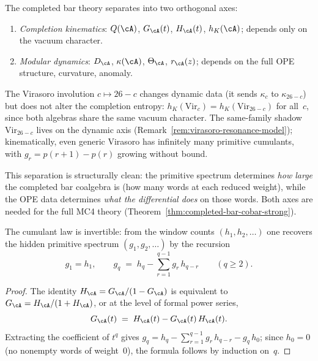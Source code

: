 \begin{remark}
\label{rem:kinematics-dynamics-split}

The completed bar theory separates into two orthogonal axes:
\begin{enumerate}[label=\textup{(\roman*)}]
\item \emph{Completion kinematics}:
 $Q(\cA)$, $G_\cA(t)$, $H_\cA(t)$, $h_K(\cA)$; depends
 only on the vacuum character.
\item \emph{Modular dynamics}:
 $D_\cA$, $\kappa(\cA)$, $\Theta_\cA$, $r_\cA(z)$; depends
 on the full OPE structure, curvature, anomaly.
\end{enumerate}
The Virasoro involution $c \mapsto 26 - c$ changes dynamic
data (it sends $\kappa_c$ to $\kappa_{26-c}$) but does not
alter the completion entropy:
$h_K(\mathrm{Vir}_c) = h_K(\mathrm{Vir}_{26-c})$
for all~$c$, since both algebras share the same vacuum
character. The same-family shadow $\mathrm{Vir}_{26-c}$
lives on the dynamic axis
(Remark~\ref{rem:virasoro-resonance-model});
kinematically, even generic Virasoro has infinitely many
primitive cumulants, with $g_r = p(r+1) - p(r)$ growing
without bound.

\smallskip
This separation is structurally clean: the primitive spectrum
determines \emph{how large} the completed bar coalgebra is
(how many words at each reduced weight), while the OPE data
determines \emph{what the differential does} on those words.
Both axes are needed for the full MC4 theory
(Theorem~\textup{\ref{thm:completed-bar-cobar-strong}}).
\end{remark}

\begin{proposition}
\label{prop:cumulant-window-inversion}

The cumulant law is invertible: from the window counts
$(h_1, h_2, \ldots)$ one recovers the hidden primitive spectrum
$(g_1, g_2, \ldots)$ by the recursion
\begin{equation}
\label{eq:cumulant-window-inversion}
g_1 = h_1, \qquad
g_q \;=\; h_q - \sum_{r=1}^{q-1} g_r\, h_{q-r}
\qquad (q \geq 2).
\end{equation}
\end{proposition}

\begin{proof}
The identity $H_\cA = G_\cA/(1 - G_\cA)$ is equivalent to
$G_\cA = H_\cA/(1 + H_\cA)$, or at the level of formal power
series,
\[
G_\cA(t) \;=\; H_\cA(t) - G_\cA(t)\,H_\cA(t).
\]
Extracting the coefficient of $t^q$ gives
$g_q = h_q - \sum_{r=1}^{q-1} g_r\, h_{q-r} - g_q\, h_0$;
since $h_0 = 0$ (no nonempty words of weight~$0$), the formula
follows by induction on~$q$.
\end{proof}

